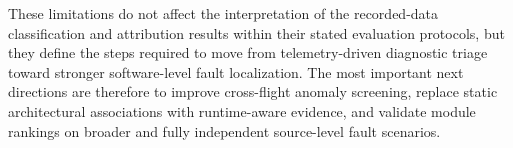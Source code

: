 These limitations do not affect the interpretation of the recorded-data classification and attribution results within their stated evaluation protocols, but they define the steps required to move from telemetry-driven diagnostic triage toward stronger software-level fault localization. The most important next directions are therefore to improve cross-flight anomaly screening, replace static architectural associations with runtime-aware evidence, and validate module rankings on broader and fully independent source-level fault scenarios.
